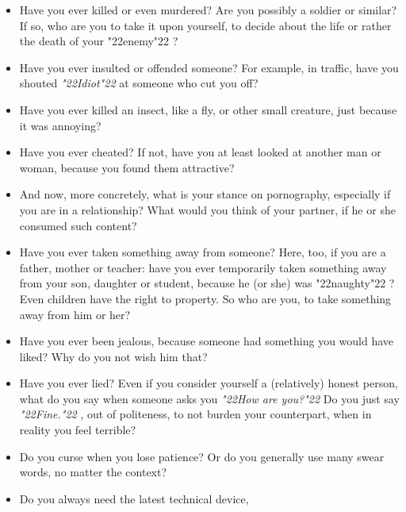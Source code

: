 \documentclass[12pt,a5paper]{article}
\newcommand{\q}[1]{\char"22{#1}\char"22 }
\newcommand{\qq}[1]{\textit{\q{#1}}}
\begin{document}
\begin{itemize}[nosep]
			\item	Have you ever killed or even murdered?
					Are you possibly a soldier or similar?
					If so,
					who are you to take it upon yourself,
					to decide about the life or rather the death of your \q{enemy}?
					\\
			\item	Have you ever insulted or offended someone?
					For example,
					in traffic,
					have you shouted \qq{Idiot} at someone who cut you off?
					\\
			\item	Have you ever killed an insect,
					like a fly,
					or other small creature,
					just because it was annoying?
					\\
			\item	Have you ever cheated?
					If not,
					have you at least looked at another man or woman,
					because you found them attractive?
					\\
			\item	And now,
					more concretely,
					what is your stance on pornography,
					especially if you are in a relationship?
					What would you think of your partner,
					if he or she consumed such content?
					\\
			\item	Have you ever taken something away from someone?
					Here,
					too,
					if you are a father,
					mother or teacher:
					have you ever temporarily taken something away from your son,
					daughter or student,
					because he (or she) was \q{naughty}?
					Even children have the right to property.
					So who are you,
					to take something away from him or her?
					\\
			\item	Have you ever been jealous,
					because someone had something you would have liked?
					Why do you not wish him that?
					\\
			\item	Have you ever lied?
					Even if you consider yourself a (relatively) honest person,
					what do you say when someone asks you
					\qq{How are you?}
					Do you just say \qq{Fine.},
					out of politeness,
					to not burden your counterpart,
					when in reality you feel terrible?
					\\
			\item	Do you curse when you lose patience?
					Or do you generally use many swear words,
					no matter the context?
					\\
			\item	Do you always need the latest technical device,

\end{itemize}
\end{document}
